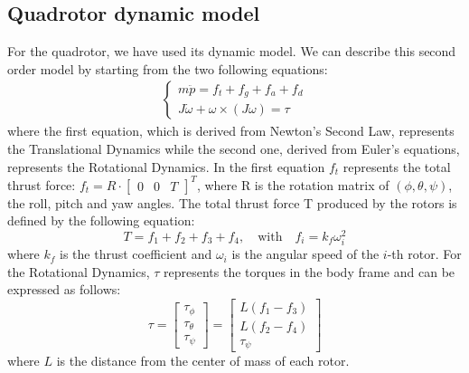 \subsection{Quadrotor dynamic model}
For the quadrotor, we have used its dynamic model. We can describe this second order model by starting from the two following equations:
\begin{align}
    \label{eq:uav_start}
    \begin{cases}
         m \ddot{p} = f_{t} + f_{g} + f_{a} + f_{d} \\
         J \dot{\omega} + \omega \times (J \omega) = \tau
    \end{cases}  
\end{align}
where the first equation, which is derived from Newton's Second Law, represents the Translational Dynamics while the second one, derived from Euler's equations, represents the Rotational Dynamics.
In the first equation $f_{t}$ represents the total thrust force: $f_{t} = R \cdot \begin{bmatrix} 0 & 0 & T \end{bmatrix} ^T$, where R is the rotation matrix of $(\phi, \theta, \psi)$, the roll, pitch and yaw angles. The total thrust force T produced by the rotors is defined by the following equation:
\begin{equation}
    \label{eq:thrust}
    T = f_1 + f_2 + f_3 + f_4,\quad \text{with} \quad f_i = k_f \omega_i^2
\end{equation}
where $k_f$ is the thrust coefficient and $\omega_i$ is the angular speed of the $i$-th rotor.
For the Rotational Dynamics, $\tau$ represents the torques in the body frame and can be expressed as follows:
\begin{equation}
    \tau =
    \begin{bmatrix}
        \tau_{\phi} \\
        \tau_{\theta} \\
        \tau_{\psi}
    \end{bmatrix}
    =
    \begin{bmatrix}
        L(f_1 - f_3) \\
        L(f_2 - f_4) \\
        \tau_{\psi}
    \end{bmatrix}
\end{equation}
where $L$ is the distance from the center of mass of each rotor.


